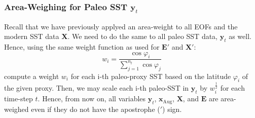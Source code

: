 \documentclass{article}
\begin{document}
\subsubsection{Area-Weighing for Paleo SST $\textbf{y}_t$}
Recall that we have previously applyed an area-weight to all EOFs and the modern SST data \textbf{X}.
We need to do the same to all paleo SST data, $\textbf{y}_t$ as well.
Hence, using the same weight function as used for $\textbf{E}'$ and $\textbf{X}'$:
$$w_i = \frac{\cos\varphi_i}{\sum_{j=1}^{n_t} \cos\varphi_j}$$
compute a weight $w_i$ for each i-th paleo-proxy SST based on the latitude $\varphi_i$ of the given proxy.
Then, we may scale each i-th paleo-SST in $\textbf{y}_t$ by $w_i^{\frac{1}{2}}$ for each time-step $t$.
Hence, from now on, all variables $\textbf{y}_t$, $\textbf{x}_{\text{Aug}}$, $\textbf{X}$, and $\textbf{E}$ are area-weighed even if they do not have the apostrophe ($'$) sign.
\end{document}
